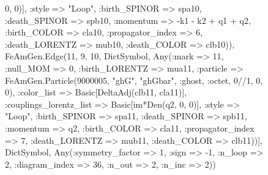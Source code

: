 \documentclass{revtex4}
\begin{document}
\begin{figure}[!htb]
\begin{center}
{0, 0)], :style => "Loop", :birth_SPINOR => spa10, :death_SPINOR => spb10, :momentum => -k1 - k2 + q1 + q2, :birth_COLOR => cla10, :propagator_index => 6, :death_LORENTZ => mub10, :death_COLOR => clb10)), FeAmGen.Edge(11, 9, 10, Dict{Symbol, Any}(:mark => 11, :null_MOM => 0, :birth_LORENTZ => mua11, :particle => FeAmGen.Particle(9000005, "ghG", "ghGbar", :ghost, :octet, 0//1, 0, 0), :color_list => Basic[DeltaAdj(clb11, cla11)], :couplings_lorentz_list => Basic[im*Den(q2, 0, 0)], :style => "Loop", :birth_SPINOR => spa11, :death_SPINOR => spb11, :momentum => q2, :birth_COLOR => cla11, :propagator_index => 7, :death_LORENTZ => mub11, :death_COLOR => clb11))], Dict{Symbol, Any}(:symmetry_factor => 1, :sign => -1, :n_loop => 2, :diagram_index => 36, :n_out => 2, :n_inc => 2)) 
}
\end{center}
\end{figure}
\end{document}
